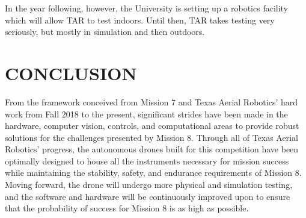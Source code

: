 \documentclass[12pt,letterpaper]{article}
\begin{document}
In the year following, however, the University is setting up a robotics facility which will allow TAR to test indoors. Until then, TAR takes testing very seriously, but mostly in simulation and then outdoors. 


\section*{CONCLUSION}
	From the framework conceived from Mission 7 and Texas Aerial Robotics’ hard work from Fall 2018 to the present, significant strides have been made in the hardware, computer vision, controls, and computational areas to provide robust solutions for the challenges presented by Mission 8. Through all of Texas Aerial Robotics’ progress, the autonomous drones built for this competition have been optimally designed to house all the instruments necessary for mission success while maintaining the stability, safety, and endurance requirements of Mission 8. Moving forward, the drone will undergo more physical and simulation testing, and the software and hardware will be continuously improved upon to ensure that the probability of success for Mission 8 is as high as possible. 
	\nocite{ORBSLAM2}
	\nocite{daoud2018slamm}
	
	
\end{document}
